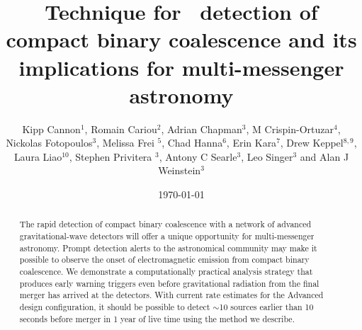 \documentclass{iopart}
\begin{document}
\title[Early-warning detection of compact binary coalescence]{Technique for \earlywarning\ detection of compact binary
coalescence and its implications for multi-messenger astronomy}

\date{\today}

\author{Kipp Cannon$^{1}$, Romain Cariou$^{2}$, Adrian Chapman$^3$, M
Crispin-Ortuzar$^4$, Nickolas Fotopoulos$^3$, Melissa Frei $^5$, Chad
Hanna$^{6}$, Erin Kara$^{7}$, Drew Keppel$^{8,9}$, Laura Liao$^{10}$, Stephen
Privitera $^3$, Antony C Searle$^3$, Leo Singer$^3$ and Alan J  Weinstein$^3$}

\address{$^1$ Canadian Institute for Theoretical Astrophysics, Toronto, ON,
Canada}
\address{$^2$  D\'{e}partement de physique, \'{E}cole Normale Sup\'{e}rieure de Cachan, Cachan, France}
\address{$^3$ LIGO Laboratory - California Institute of Technology, Pasadena,
CA, USA} 
\address{$^4$ Facultat de F\'{i}sica, Universitat de Val\`{e}ncia, Burjassot,
Spain} 
\address{$^5$ The University of Texas at Austin, Austin, TX, USA}
\address{$^6$ Perimeter Institute for Theoretical Physics, Waterloo, ON,
Canada} 
\address{$^7$ Department of Physics and Astronomy, Barnard College, Columbia
University, New York, NY, USA} 
\address{$^8$ Albert-Einstein-Institut, Max-Planck-Institut f\"{u}r
Gravitationphysik, Hannover, Germany} 
\address{$^9$ Leibniz Universit\"{a}t Hannover, Hannover, Germany}
\address{$^{10}$ Ryerson University, Toronto, ON, Canada}

\begin{abstract}
The rapid detection of compact binary coalescence with a network of advanced
gravitational-wave detectors will offer a unique opportunity for
multi-messenger astronomy.  Prompt detection alerts to the astronomical
community may make it possible to observe the onset of electromagnetic emission
from compact binary coalescence.  We demonstrate a computationally practical
analysis strategy that produces early warning triggers even before
gravitational radiation from the final merger has arrived at the detectors.
With current rate estimates for the Advanced \LIGO{} design configuration, it
should be possible to detect $\sim$10 sources earlier than 10 seconds before
merger in 1 year of live time using the method we describe.
\end{abstract}







\end{document}
